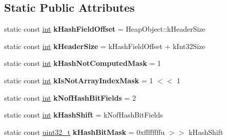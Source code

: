 \subsection*{Static Public Attributes}
\begin{DoxyCompactItemize}
\item 
\mbox{\label{classv8_1_1internal_1_1Name_a6470e0e9daf944b4cd9bfff26aebb031}} 
static const \mbox{\hyperlink{classint}{int}} {\bfseries k\+Hash\+Field\+Offset} = Heap\+Object\+::k\+Header\+Size
\item 
\mbox{\label{classv8_1_1internal_1_1Name_afc4bd497b950852b540da4e5ef9d079a}} 
static const \mbox{\hyperlink{classint}{int}} {\bfseries k\+Header\+Size} = k\+Hash\+Field\+Offset + k\+Int32\+Size
\item 
\mbox{\label{classv8_1_1internal_1_1Name_a6379c93f471c1fb21182d903fa4dff79}} 
static const \mbox{\hyperlink{classint}{int}} {\bfseries k\+Hash\+Not\+Computed\+Mask} = 1
\item 
\mbox{\label{classv8_1_1internal_1_1Name_a9b9885f1eea305e5b9a83946791cad48}} 
static const \mbox{\hyperlink{classint}{int}} {\bfseries k\+Is\+Not\+Array\+Index\+Mask} = 1 $<$$<$ 1
\item 
\mbox{\label{classv8_1_1internal_1_1Name_ab0662a44175aad38e3e5665109598155}} 
static const \mbox{\hyperlink{classint}{int}} {\bfseries k\+Nof\+Hash\+Bit\+Fields} = 2
\item 
\mbox{\label{classv8_1_1internal_1_1Name_a155b0b4b5fe46062d9171d2493a59e1f}} 
static const \mbox{\hyperlink{classint}{int}} {\bfseries k\+Hash\+Shift} = k\+Nof\+Hash\+Bit\+Fields
\item 
\mbox{\label{classv8_1_1internal_1_1Name_a9b592cfd6109e2831514bbde5d0aaea3}} 
static const \mbox{\hyperlink{classuint32__t}{uint32\+\_\+t}} {\bfseries k\+Hash\+Bit\+Mask} = 0xffffffffu $>$$>$ k\+Hash\+Shift
\item 
\mbox{\label{classv8_1_1internal_1_1Name_a29a07cb2ebdab579a278a6891edfdcae}} 

\end{DoxyCompactItemize}
